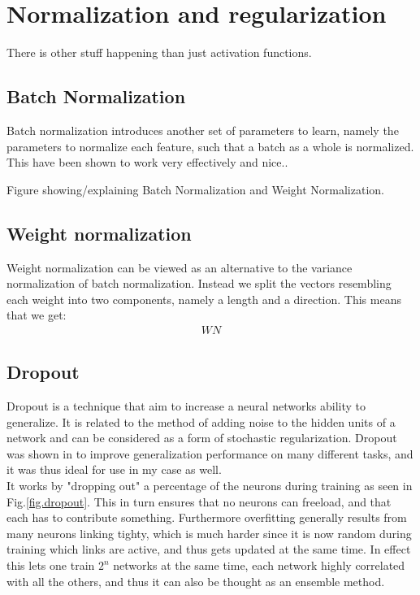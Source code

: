 \section{Normalization and regularization}
There is other stuff happening than just activation functions.
\subsection{Batch Normalization}
Batch normalization introduces another set of parameters to learn, namely the parameters to normalize each feature, such that a batch as a whole is normalized. This have been shown to work very effectively and nice..
\cite{santurkarHowDoesBatch2019}

\begin{marginfigure}
\caption{Figure showing/explaining Batch Normalization and Weight Normalization.}
\end{marginfigure} 

\subsection{Weight normalization}
Weight normalization\cite{salimansWeightNormalizationSimple} can be viewed as an alternative to the variance normalization of batch normalization. Instead we split the vectors resembling each weight into two components, namely a length and a direction. This means that we get:
\begin{align}
	WN
\end{align}

\subsection{Dropout}

Dropout\cite{hintonImprovingNeuralNetworks2012} is a technique that aim to increase a neural networks ability to generalize. It is related to the method of adding noise to the hidden units of a network and can be considered as a form of stochastic regularization. Dropout was shown in\cite{srivastavaDropoutSimpleWay2014} to improve generalization performance on many different tasks, and it was thus ideal for use in my case as well.\\

It works by "dropping out" a percentage of the neurons during training as seen in Fig.\ref{fig.dropout}. This in turn ensures that no neurons can freeload, and that each has to contribute something. Furthermore overfitting generally results from many neurons linking tighty, which is much harder since it is now random during training which links are active, and thus gets updated at the same time. In effect this lets one train $2^n$ networks at the same time, each network highly correlated with all the others, and thus it can also be thought as an ensemble method.\\

